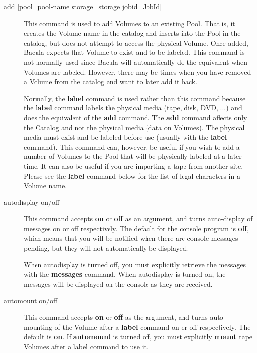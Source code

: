 \begin{description}
\item [{add [pool=\lt{}pool-name\gt{} storage=\lt{}storage\gt{}
   jobid=\lt{}JobId\gt{}]} ]
   This command is used to add Volumes to an existing Pool.  That is,
   it creates the Volume name in the catalog and inserts into the Pool
   in the catalog, but does not attempt to access the physical Volume.
   Once
   added, Bacula expects that Volume to exist and to be labeled.
   This command is not normally used since Bacula will 
   automatically do the equivalent when Volumes are labeled. However,
   there may be times when you have removed a Volume from the catalog
   and want to later add it back.

   Normally, the {\bf label} command is used rather than this command
   because the {\bf label} command labels the physical media (tape, disk,
   DVD, ...) and does the equivalent of the {\bf add} command.  The {\bf
   add} command affects only the Catalog and not the physical media (data
   on Volumes).  The physical media must exist and be labeled before use
   (usually with the {\bf label} command).  This command can, however, be
   useful if you wish to add a number of Volumes to the Pool that will be
   physically labeled at a later time.  It can also be useful if you are
   importing a tape from another site.  Please see the {\bf label} command
   below for the list of legal characters in a Volume name.

\item [autodisplay on/off]
   This command accepts {\bf on} or {\bf off} as an argument, and turns
   auto-display of messages on or off respectively.  The default for the
   console program is {\bf off}, which means that you will be notified when
   there are console messages pending, but they will not automatically be
   displayed.

   When autodisplay is turned off, you must explicitly retrieve the
   messages with the {\bf messages} command.  When autodisplay is turned
   on, the messages will be displayed on the console as they are received.

\item [automount on/off]
   This command accepts {\bf on} or {\bf off} as the argument, and turns
   auto-mounting of the Volume after a {\bf label} command on or off
   respectively.  The default is {\bf on}.  If {\bf automount} is turned
   off, you must explicitly {\bf mount} tape Volumes after a label command to
   use it.


\end{description}
